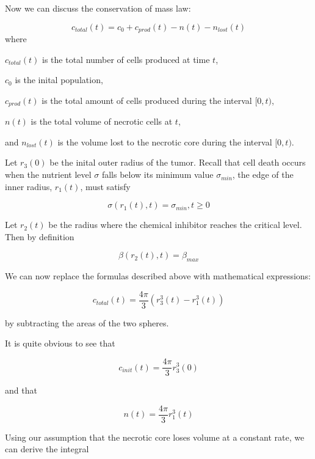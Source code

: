 \documentclass{article}
\begin{document}
Now we can discuss the conservation of mass law:

\begin{equation}
    c_{total}(t) = c_0 + c_{prod}(t) - n(t) - n_{lost}(t)
    \label{eq:conservation}
\end{equation}
where

$c_{total}(t)$ is the total number of cells produced at time $t$,

$c_0$ is the inital population,

$c_{prod}(t)$ is the total amount of cells produced during the interval $[0, t)$,

$n(t)$ is the total volume of necrotic cells at $t$,

and $n_{lost}(t)$ is the volume lost to the necrotic core during the interval $[0, t)$.

Let $r_3(0)$ be the inital outer radius of the tumor. Recall that cell death occurs when the nutrient level $\sigma$ falls below
its minimum value $\sigma_{min}$, the edge of the inner radius, $r_1(t)$, must satisfy

\begin{equation}
    \sigma(r_1(t), t) = \sigma_{min}, t \geq 0
\end{equation}

Let $r_2(t)$ be the radius where the chemical inhibitor reaches the critical level. Then by definition

\begin{equation}
    \beta(r_2(t), t) = \beta_{max}
\end{equation}

We can now replace the formulas described above with mathematical expressions:

\begin{equation}
    c_{total}(t) = \frac{4\pi}{3}(r_3^3(t) - r_1^3(t))
\end{equation}

by subtracting the areas of the two spheres.

It is quite obvious to see that

\begin{equation}
    c_{init}(t) = \frac{4\pi}{3}r_3^3(0)
\end{equation}

and that

\begin{equation}
    n(t) = \frac{4\pi}{3}r_1^3(t)
\end{equation}

Using our assumption that the necrotic core loses volume at a constant rate, we can derive the integral
\end{document}
